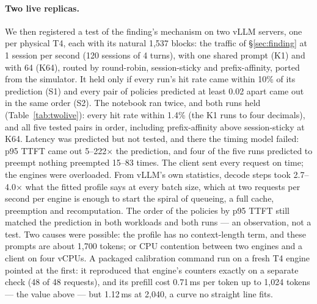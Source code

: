 \documentclass[10pt,twocolumn]{article}
\begin{document}
\paragraph{Two live replicas.} We then registered a test of the finding's mechanism on two vLLM
servers, one per physical T4, each with its natural 1{,}537 blocks: the traffic of \S\ref{sec:finding}
at 1 session per second (120 sessions of 4 turns), with one shared prompt (K1) and with 64 (K64),
routed by round-robin, session-sticky and prefix-affinity, ported from the simulator. It held only if
every run's hit rate came within 10\% of its prediction (S1) and every pair of policies predicted at
least 0.02 apart came out in the same order (S2). The notebook ran twice, and both runs held
(Table~\ref{tab:twolive}): every hit rate within 1.4\% (the K1 runs to four decimals), and all five
tested pairs in order, including prefix-affinity above session-sticky at K64. Latency was predicted
but not tested, and there the timing model failed: p95 TTFT came out 5--222$\times$ the prediction,
and four of the five runs predicted to preempt nothing preempted 15--83 times. The client sent every request on time; the
engines were overloaded. From vLLM's own statistics, decode steps took 2.7--4.0$\times$ what the
fitted profile says at every batch size, which at two requests per second per engine is enough to
start the spiral of queueing, a full cache, preemption and recomputation. The order of the policies
by p95 TTFT still matched the prediction in both workloads and both runs --- an observation, not a
test. Two causes were possible: the profile has no context-length term, and these prompts are about
1{,}700 tokens; or CPU contention between two engines and a client on four vCPUs. A packaged
calibration command run on a fresh T4 engine pointed at the first: it reproduced that engine's
counters exactly on a separate check (48 of 48 requests), and its prefill cost 0.71\,ms per token up
to 1{,}024 tokens --- the value above --- but 1.12\,ms at 2{,}040, a curve no straight line fits.
\end{document}
